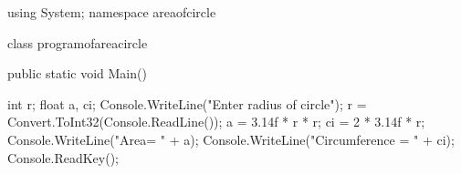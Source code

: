 using System;
namespace areaofcircle
{
    class programofareacircle
    {
         public static void Main()
        {
            int r;
            float a, ci;
            Console.WriteLine("Enter radius of circle");
            r = Convert.ToInt32(Console.ReadLine());
            a = 3.14f * r * r;
            ci = 2 * 3.14f * r;
            Console.WriteLine("Area= " + a);
            Console.WriteLine("Circumference = " + ci);
            Console.ReadKey();

        }
    }
}
